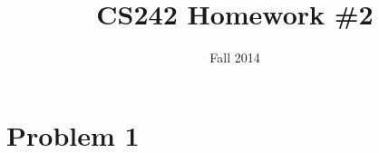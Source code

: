 \documentclass{article}
\title{CS242 Homework \#2}
\author{}
\date{Fall 2014}
\begin{document}
 \maketitle \pagestyle{empty}
\section*{Problem 1}
\end{document}
